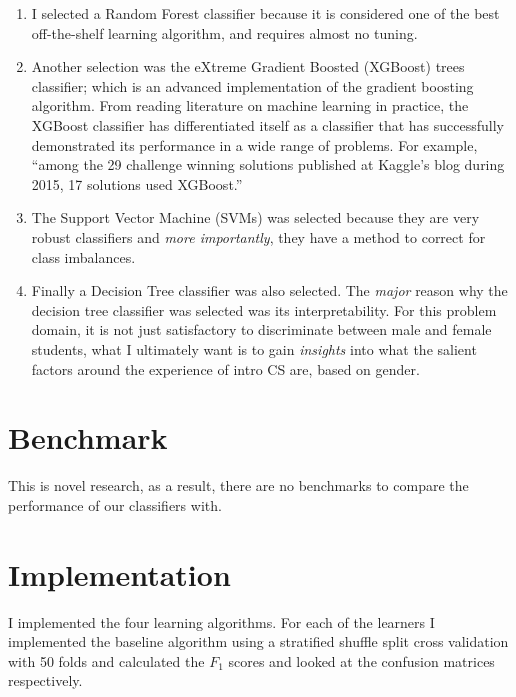 \begin{enumerate}%
\item I selected a Random Forest classifier because it is considered one of the best off-the-shelf learning algorithm, and requires almost no tuning. 

\item Another selection was the eXtreme Gradient Boosted (XGBoost) trees classifier; which is an advanced implementation of the gradient boosting algorithm. From reading literature on machine learning in practice, the XGBoost classifier has differentiated itself as a classifier that has successfully demonstrated its performance in a wide range of problems. For example, ``among the 29 challenge winning solutions published at Kaggle's blog during 2015, 17 solutions used XGBoost.''

\item The Support Vector Machine (SVMs) was selected because they are very robust classifiers and \textit{more importantly}, they have a method to correct for class imbalances. 
              
\item Finally a Decision Tree classifier was also selected. The \textit{major} reason why the decision tree classifier was selected was its interpretability. For this problem domain, it is not just satisfactory to discriminate between male and female students, what I ultimately want is to gain \textit{insights} into what the salient factors around the experience of intro CS are, based on gender.

\end{enumerate}

\section*{Benchmark}

This is novel research, as a result, there are no benchmarks to compare the performance of our classifiers with.

\section*{Implementation}
I implemented the four learning algorithms. For each of the learners I implemented the baseline algorithm using a stratified shuffle split cross validation with 50 folds and calculated the $F_1$ scores and looked at the confusion matrices respectively. 


